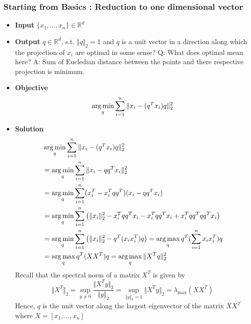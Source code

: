 \documentclass{article}
\begin{document}
\subsubsection{Starting from Basics : Reduction to one dimensional vector}
\begin{itemize}
    \item \textbf{Input} $\{x_1, \dots, x_n\} \in \mathbb{R}^d$
    \item \textbf{Output} $q \in \mathbb{R}^d$, s.t. $\Vert q \Vert_2=1$ and $q$ is a unit vector in a direction along which the projection of $x_i$ are optimal in some sense? Q: What does optimal mean here? A: Sum of Eucledian distance between the points and there respective projection is minimum.
    \item \textbf{Objective} 
        $$\operatorname*{arg\,min}_{q} \sum_{i=1}^n \Vert x_i - (q^Tx_i)q \Vert_2^2  $$
    \item \textbf{Solution} 
        \begin{align*}
            & \operatorname*{arg\,min}_{q} \sum_{i=1}^n \Vert x_i - (q^Tx_i)q \Vert_2^2 \\
            &= \operatorname*{arg\,min}_{q} \sum_{i=1}^n \Vert x_i - qq^Tx_i \Vert_2^2 \\
            &= \operatorname*{arg\,min}_{q} \sum_{i=1}^n (x_i^T - x_i^Tqq^T)(x_i - qq^Tx_i) \\
            &= \operatorname*{arg\,min}_{q} \sum_{i=1}^n \left( \Vert x_i \Vert_2^2 - x_i^Tqq^Tx_i - x_i^Tqq^Tx_i + x_i^Tqq^Tqq^Tx_i \right)\\
            &= \operatorname*{arg\,min}_{q} \sum_{i=1}^n \left( \Vert x_i \Vert_2^2 - q^T(x_ix_i^T)q \right)
            = \operatorname*{arg\,max}_{q} q^T( \sum_{i=1}^n x_ix_i^T)q\\
            &= \operatorname*{arg\,max}_{q} q^T( XX^T )q = \operatorname*{arg\,max}_{q} \Vert X^Tq \Vert_2^2
        \end{align*}
        Recall that the spectral norm of a matrix $X^T$ is given by
        $$\Vert X^T\Vert_2 = \sup_{y \neq 0} \frac{\Vert X^Ty \Vert_2}{\Vert y \Vert_2} = \sup_{\Vert y \Vert_2 = 1} \Vert X^Ty \Vert_2 = \lambda_{\text{max}}(XX^T)$$
        Hence, $q$ is the unit vector along the largest eigenvector of the matrix $XX^T$ where $X = [x_1, \dots, x_n]$
\end{itemize}
\end{document}
